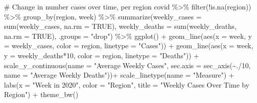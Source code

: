 \documentclass[
  letterpaper,
]{latex/krantz}
\makeatletter
\newenvironment{Shaded}{\begin{snugshade}}{\end{snugshade}}
\newcommand{\AttributeTok}[1]{\textcolor[rgb]{0.40,0.45,0.13}{#1}}
\newcommand{\CommentTok}[1]{\textcolor[rgb]{0.37,0.37,0.37}{#1}}
\newcommand{\ConstantTok}[1]{\textcolor[rgb]{0.56,0.35,0.01}{#1}}
\newcommand{\DecValTok}[1]{\textcolor[rgb]{0.68,0.00,0.00}{#1}}
\newcommand{\FunctionTok}[1]{\textcolor[rgb]{0.28,0.35,0.67}{#1}}
\newcommand{\NormalTok}[1]{\textcolor[rgb]{0.00,0.23,0.31}{#1}}
\newcommand{\SpecialCharTok}[1]{\textcolor[rgb]{0.37,0.37,0.37}{#1}}
\newcommand{\StringTok}[1]{\textcolor[rgb]{0.13,0.47,0.30}{#1}}
\newenvironment{kframe}{%
\medskip{}
\setlength{\fboxsep}{.8em}
 \def\at@end@of@kframe{}%
 \ifinner\ifhmode%
  \def\at@end@of@kframe{\end{minipage}}%
  \begin{minipage}{\columnwidth}%
 \fi\fi%
 \def\FrameCommand##1{\hskip\@totalleftmargin \hskip-\fboxsep
 \colorbox{shadecolor}{##1}\hskip-\fboxsep
     \hskip-\linewidth \hskip-\@totalleftmargin \hskip\columnwidth}%
 \MakeFramed {\advance\hsize-\width
   \@totalleftmargin\z@ \linewidth\hsize
   \@setminipage}}%
 {\par\unskip\endMakeFramed%
 \at@end@of@kframe}
\renewenvironment{Shaded}{\begin{kframe}}{\end{kframe}}
\makeatother
\begin{document}
\begin{Shaded}
\begin{Highlighting}[]
\CommentTok{\# Change in number cases over time, per region}
\NormalTok{covid }\SpecialCharTok{\%\textgreater{}\%}
  \FunctionTok{filter}\NormalTok{(}\SpecialCharTok{!}\FunctionTok{is.na}\NormalTok{(region)) }\SpecialCharTok{\%\textgreater{}\%} 
  \FunctionTok{group\_by}\NormalTok{(region, week) }\SpecialCharTok{\%\textgreater{}\%}
  \FunctionTok{summarize}\NormalTok{(}\AttributeTok{weekly\_cases =} \FunctionTok{sum}\NormalTok{(weekly\_cases, }\AttributeTok{na.rm =} \ConstantTok{TRUE}\NormalTok{),}
            \AttributeTok{weekly\_deaths =} \FunctionTok{sum}\NormalTok{(weekly\_deaths, }\AttributeTok{na.rm =} \ConstantTok{TRUE}\NormalTok{),}
            \AttributeTok{.groups =} \StringTok{"drop"}\NormalTok{) }\SpecialCharTok{\%\textgreater{}\%}
\FunctionTok{ggplot}\NormalTok{() }\SpecialCharTok{+}
  \FunctionTok{geom\_line}\NormalTok{(}\FunctionTok{aes}\NormalTok{(}\AttributeTok{x =}\NormalTok{ week, }\AttributeTok{y =}\NormalTok{ weekly\_cases, }\AttributeTok{color =}\NormalTok{ region, }
                \AttributeTok{linetype =} \StringTok{"Cases"}\NormalTok{)) }\SpecialCharTok{+} 
  \FunctionTok{geom\_line}\NormalTok{(}\FunctionTok{aes}\NormalTok{(}\AttributeTok{x =}\NormalTok{ week, }\AttributeTok{y =}\NormalTok{ weekly\_deaths}\SpecialCharTok{*}\DecValTok{10}\NormalTok{, }\AttributeTok{color =}\NormalTok{ region, }
                \AttributeTok{linetype =} \StringTok{"Deaths"}\NormalTok{)) }\SpecialCharTok{+}
  \FunctionTok{scale\_y\_continuous}\NormalTok{(}\AttributeTok{name =} \StringTok{"Average Weekly Cases"}\NormalTok{,}
                     \AttributeTok{sec.axis =} \FunctionTok{sec\_axis}\NormalTok{(}\SpecialCharTok{\textasciitilde{}}\NormalTok{.}\SpecialCharTok{/}\DecValTok{10}\NormalTok{, }
                          \AttributeTok{name =} \StringTok{"Average Weekly Deaths"}\NormalTok{))}\SpecialCharTok{+}
  \FunctionTok{scale\_linetype}\NormalTok{(}\AttributeTok{name =} \StringTok{"Measure"}\NormalTok{) }\SpecialCharTok{+}
  \FunctionTok{labs}\NormalTok{(}\AttributeTok{x =} \StringTok{"Week in 2020"}\NormalTok{, }\AttributeTok{color =} \StringTok{"Region"}\NormalTok{, }
       \AttributeTok{title =} \StringTok{"Weekly Cases Over Time by Region"}\NormalTok{) }\SpecialCharTok{+}
  \FunctionTok{theme\_bw}\NormalTok{()}
\end{Highlighting}
\end{Shaded}
\end{document}
